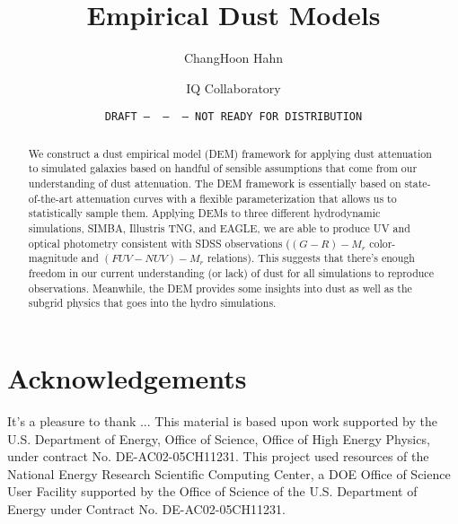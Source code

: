 \documentclass[12pt, letterpaper, preprint]{aastex62}
\begin{document}
\sloppy\sloppypar\frenchspacing 

\title{Empirical Dust Models} 
\date{\texttt{DRAFT~---~\githash~---~\gitdate~---~NOT READY FOR DISTRIBUTION}}

\author{ChangHoon Hahn}

\author{IQ Collaboratory}

\begin{abstract}
    We construct a dust empirical model (DEM) framework for applying dust
    attenuation to simulated galaxies based on handful of sensible assumptions
    that come from our understanding of dust attenuation. The DEM framework is
    essentially based on state-of-the-art attenuation curves with a flexible
    parameterization that allows us to statistically sample them. Applying DEMs to three
    different hydrodynamic simulations, SIMBA, Illustris TNG, and EAGLE, we
    are able to produce UV and optical photometry consistent with SDSS
    observations ($(G-R) - M_r$ color-magnitude and $(FUV-NUV)-M_r$ relations).
    This suggests that there's enough
    freedom in our current understanding (or lack) of dust for all simulations
    to reproduce observations. Meanwhile, the DEM provides some insights into
    dust as well as the subgrid physics that goes into the hydro simulations. 
\end{abstract}



 




\section*{Acknowledgements}
It's a pleasure to thank
    ...
This material is based upon work supported by the U.S. Department of Energy,
Office of Science, Office of High Energy Physics, under contract No.
DE-AC02-05CH11231.  This project used resources of the National Energy Research
Scientific Computing Center, a DOE Office of Science User Facility supported by
the Office of Science of the U.S.  Department of Energy under Contract No.
DE-AC02-05CH11231. 

\appendix
 
 


 
\end{document}
